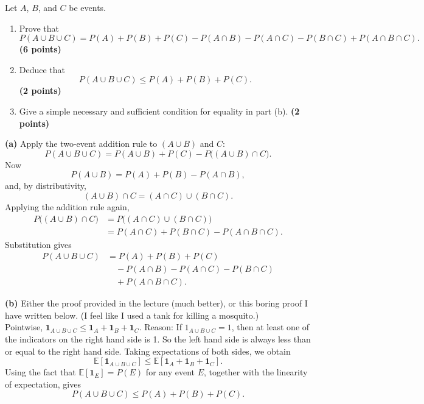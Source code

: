 \documentclass[11pt]{article}
\begin{document}
Let $A$, $B$, and $C$ be events.

\begin{enumerate}[label=(\alph*),leftmargin=*,itemsep=0.75em]
    \item Prove that
    \[
    P(A\cup B\cup C)
    =P(A)+P(B)+P(C)
    -P(A\cap B)-P(A\cap C)-P(B\cap C)
    +P(A\cap B\cap C).
    \]
    \hfill \textbf{(6 points)}

    \item Deduce that
    \[
    P(A\cup B\cup C)\leq P(A)+P(B)+P(C).
    \]
    \hfill \textbf{(2 points)}

    \item Give a simple necessary and sufficient condition for equality in part (b). \hfill \textbf{(2 points)}
\end{enumerate}

\begin{solutionbox}
\textbf{(a)} Apply the two-event addition rule to $(A\cup B)$ and $C$:
\[
P(A\cup B\cup C)=P(A\cup B)+P(C)-P\bigl((A\cup B)\cap C\bigr).
\]
Now
\[
P(A\cup B)=P(A)+P(B)-P(A\cap B),
\]
and, by distributivity,
\[
(A\cup B)\cap C=(A\cap C)\cup(B\cap C).
\]
Applying the addition rule again,
\begin{align*}
P\bigl((A\cup B)\cap C\bigr)
&=P\bigl((A\cap C)\cup(B\cap C)\bigr)\\
&=P(A\cap C)+P(B\cap C)-P(A\cap B\cap C).
\end{align*}
Substitution gives
\begin{align*}
P(A\cup B\cup C)
&=P(A)+P(B)+P(C)\\
&\quad-P(A\cap B)-P(A\cap C)-P(B\cap C)\\
&\quad+P(A\cap B\cap C).
\end{align*}

\textbf{(b)} Either the proof provided in the lecture (much better), or this boring proof I have written below. (I feel like I used a tank for killing a mosquito.)\\
Pointwise, $\mathbf{1}_{A\cup B\cup C}\leq \mathbf{1}_A+\mathbf{1}_B+\mathbf{1}_C$. Reason: If $1_{A\cup B \cup C}=1$, then at least one of the indicators on the right hand side is 1. So the left hand side is always less than or equal to the right hand side. 
Taking expectations of both sides, we obtain
\[
\mathbb{E}\!\left[\mathbf{1}_{A\cup B\cup C}\right]
\le
\mathbb{E}\!\left[\mathbf{1}_A+\mathbf{1}_B+\mathbf{1}_C\right].
\]
Using the fact that $\mathbb{E}[\mathbf{1}_E]=P(E)$ for any event $E$, together with the linearity of expectation, gives
\[
P(A\cup B\cup C)
\le
P(A)+P(B)+P(C).
\]





\end{solutionbox}
\end{document}
